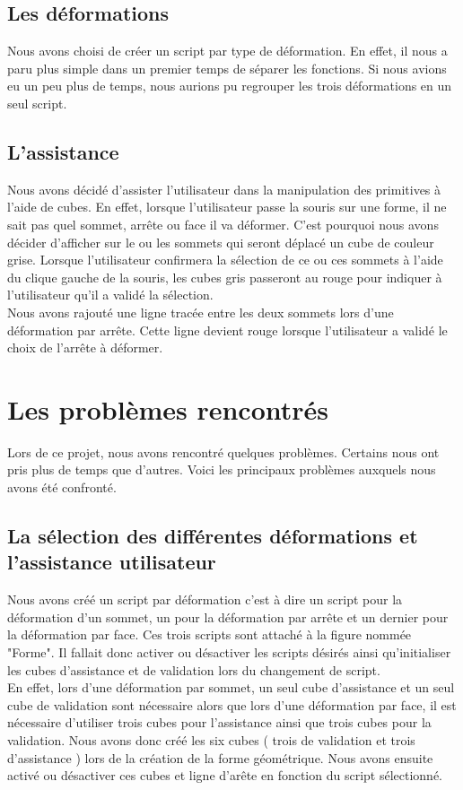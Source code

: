 \documentclass[a4paper,oneside,12pt,titlepage]{article}
\begin{document}
\subsection{Les déformations}

Nous avons choisi de créer un script par type de déformation. En effet, il nous a paru plus simple dans un premier temps de séparer les fonctions. Si nous avions eu un peu plus de temps, nous aurions pu regrouper les  trois déformations en un seul script.

\subsection{L'assistance}

Nous avons décidé d'assister l'utilisateur dans la manipulation des primitives à l'aide de cubes. En effet, lorsque l'utilisateur passe la souris sur une forme, il ne sait pas quel sommet, arrête ou face il va déformer. C'est pourquoi nous avons décider d'afficher sur le ou les sommets qui seront déplacé un cube de couleur grise. Lorsque l'utilisateur confirmera la sélection de ce ou ces sommets à l'aide du clique gauche de la souris, les cubes gris passeront au rouge pour indiquer à l'utilisateur qu'il a validé la sélection.\\
Nous avons rajouté une ligne tracée entre les deux sommets lors d'une déformation par arrête. Cette ligne devient rouge lorsque l'utilisateur a validé le choix de l'arrête à déformer.



\section{Les problèmes rencontrés}

Lors de ce projet, nous avons rencontré quelques problèmes. Certains nous ont pris plus de temps que d'autres. Voici les principaux problèmes auxquels nous avons été confronté.

\subsection{La sélection des différentes déformations et l'assistance utilisateur}
Nous avons créé un script par déformation c'est à dire un script pour la déformation d'un sommet, un pour la déformation par arrête et un dernier pour la déformation par face. Ces trois scripts sont attaché à la figure nommée "Forme". Il fallait donc activer ou désactiver les scripts désirés ainsi qu'initialiser les cubes d'assistance et de validation lors du changement de script.
\\ En effet, lors d'une déformation par sommet, un seul cube d'assistance et un seul cube de validation sont nécessaire alors que lors d'une déformation par face, il est nécessaire d'utiliser  trois cubes pour l'assistance ainsi que trois cubes pour la validation. Nous avons donc créé les six cubes ( trois de validation et trois d'assistance ) lors de la création de la forme géométrique. Nous avons ensuite activé ou désactiver ces cubes et ligne d'arête en fonction du script sélectionné.
\end{document}
